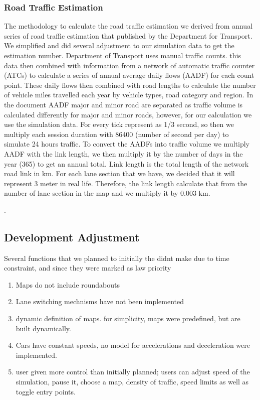 \documentclass[11pt]{article}
\begin{document}
{\begin{itemize}
\subsubsection{Road Traffic Estimation} \label{rte}
The methodology to calculate the road traffic estimation we derived from annual series of road traffic estimation that published by the Department for Transport. We simplified and did several adjustment to our simulation data to get the estimation number. Department of Transport uses manual traffic counts. this data then combined with information from a network of automatic traffic counter (ATCs) to calculate a series of annual average daily flows (AADF) for each count point. These daily flows then combined with road lengths to calculate the number of vehicle miles travelled each year by vehicle types, road category and region. In the document AADF major and minor road are separated as traffic volume is calculated differently for major and minor roads, however, for our calculation we use the simulation data. For every tick represent as 1/3 second, so then we multiply each session duration with 86400 (number of second per day) to simulate 24 hours traffic. 
To convert the AADFs into traffic volume we multiply AADF with the link length, we then multiply it by the number of days in the year (365) to get an annual total. Link length is the total length of the network road link in km. For each lane section that we have, we decided that it will represent 3 meter in real life. Therefore, the link length calculate that from the number of lane section in the map and we multiply it by 0.003 km. 
\end{itemize}.
	
\subsection{Development Adjustment}
Several functions that we planned to initially the didnt make due to time constraint, and since they were marked as law priority
\begin{enumerate}[noitemsep]
	\item Maps do not include roundabouts
	\item Lane switching mechnisms have not been implemented
	\item dynamic definition of maps. for simplicity, maps were predefined, but are built dynamically.
	\item Cars have constant speeds, no model for accelerations and deceleration were implemented.
	\item user given more control than initially planned; users can adjust speed of the simulation, pause it, choose a map, density of traffic, speed limits as well as toggle entry points.
\end{enumerate}

}
\end{document}
